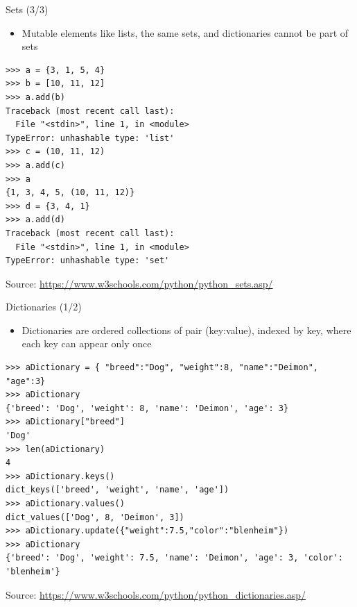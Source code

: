 \documentclass{beamer}
\begin{document}
\begin{frame}[fragile]
{\centerline{Sets (3/3)}}
\begin{itemize}
    \item Mutable elements like lists, the same sets, and dictionaries cannot be part of sets
\end{itemize}
\begin{lstlisting}[style=myPythonStyle]
>>> a = {3, 1, 5, 4}
>>> b = [10, 11, 12]
>>> a.add(b)
Traceback (most recent call last):
  File "<stdin>", line 1, in <module>
TypeError: unhashable type: 'list'
>>> c = (10, 11, 12)
>>> a.add(c)
>>> a
{1, 3, 4, 5, (10, 11, 12)}
>>> d = {3, 4, 1}
>>> a.add(d)
Traceback (most recent call last):
  File "<stdin>", line 1, in <module>
TypeError: unhashable type: 'set'
\end{lstlisting}


\begin{center}
\tiny Source: \url{https://www.w3schools.com/python/python_sets.asp/}
\end{center}


\end{frame}


\begin{frame}[fragile]
{\centerline{Dictionaries (1/2)}}
\begin{itemize}
    \item Dictionaries are ordered collections of pair (key:value), indexed by key, where each key can appear only once
\end{itemize}
\begin{lstlisting}[style=myPythonStyle]
>>> aDictionary = { "breed":"Dog", "weight":8, "name":"Deimon", "age":3}
>>> aDictionary
{'breed': 'Dog', 'weight': 8, 'name': 'Deimon', 'age': 3}
>>> aDictionary["breed"]
'Dog'
>>> len(aDictionary)
4
>>> aDictionary.keys()
dict_keys(['breed', 'weight', 'name', 'age'])
>>> aDictionary.values()
dict_values(['Dog', 8, 'Deimon', 3])
>>> aDictionary.update({"weight":7.5,"color":"blenheim"})
>>> aDictionary
{'breed': 'Dog', 'weight': 7.5, 'name': 'Deimon', 'age': 3, 'color': 'blenheim'}
\end{lstlisting}


\begin{center}
\tiny Source: \url{https://www.w3schools.com/python/python_dictionaries.asp/}
\end{center}


\end{frame}
\end{document}
